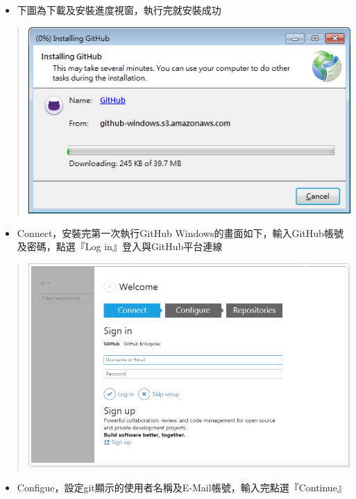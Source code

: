 \documentclass[letterpaper,10pt,english]{sphinxmanual}
\begin{document}
\begin{itemize}
\item {} 
下圖為下載及安裝進度視窗，執行完就安裝成功

\end{itemize}
\begin{quote}

\includegraphics{GitHub-Install-005.png}
\end{quote}
\begin{itemize}
\item {} 
Connect，安裝完第一次執行GitHub Windows的畫面如下，輸入GitHub帳號及密碼，點選『Log in』登入與GitHub平台連線

\end{itemize}
\begin{quote}

\includegraphics{GitHub-Install-006.png}
\end{quote}
\begin{itemize}
\item {} 
Configue，設定git顯示的使用者名稱及E-Mail帳號，輸入完點選『Continue』

\end{itemize}
\end{document}
